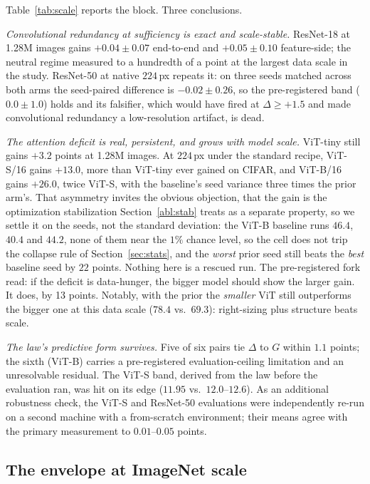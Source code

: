 Table~\ref{tab:scale} reports the block. Three conclusions.

\emph{Convolutional redundancy at sufficiency is exact and scale-stable.}
ResNet-18 at 1.28M images gains $+0.04 \pm 0.07$ end-to-end and
$+0.05 \pm 0.10$ feature-side; the neutral regime measured to a hundredth
of a point at the largest data scale in the study. ResNet-50 at native
$224$\,px repeats it: on three seeds matched across both arms the
seed-paired difference is $-0.02 \pm 0.26$, so the pre-registered band
($0.0 \pm 1.0$) holds and its falsifier, which would have fired at
$\Delta \geq +1.5$ and made convolutional redundancy a low-resolution
artifact, is dead.

\emph{The attention deficit is real, persistent, and grows with model
scale.} ViT-tiny still gains $+3.2$ points at 1.28M images. At $224$\,px
under the standard recipe, ViT-S/16 gains $+13.0$, more than ViT-tiny
ever gained on CIFAR, and ViT-B/16 gains $+26.0$, twice ViT-S, with the
baseline's seed variance three times the prior arm's. That asymmetry invites
the obvious objection, that the gain is the optimization stabilization
Section~\ref{abl:stab} treats as a separate property, so we settle it on the seeds, not the standard deviation: the ViT-B baseline runs
$46.4$, $40.4$ and $44.2$, none of them near the $1\%$ chance level, so the
cell does not trip the collapse rule of Section~\ref{sec:stats}, and the
\emph{worst} prior seed still beats the \emph{best} baseline seed by $22$
points. Nothing here is a rescued run. The pre-registered
fork read: if the deficit is data-hunger, the bigger model should show
the larger gain. It does, by 13 points. Notably, with the prior the
\emph{smaller} ViT still outperforms the bigger one at this data scale
($78.4$ vs.\ $69.3$): right-sizing plus structure beats scale.

\emph{The law's predictive form survives.} Five of six pairs tie
$\Delta$ to $G$ within $1.1$ points; the sixth (ViT-B) carries a
pre-registered evaluation-ceiling limitation and an unresolvable residual. The
ViT-S band, derived from the law before the evaluation ran, was hit on its
edge ($11.95$ vs.\ $12.0$--$12.6$). As an additional robustness check,
the ViT-S and ResNet-50 evaluations were independently re-run on a second
machine with a from-scratch environment; their means agree with the
primary measurement to $0.01$--$0.05$ points.

\subsection{The envelope at ImageNet scale}\label{sec:scaleenvelope}

